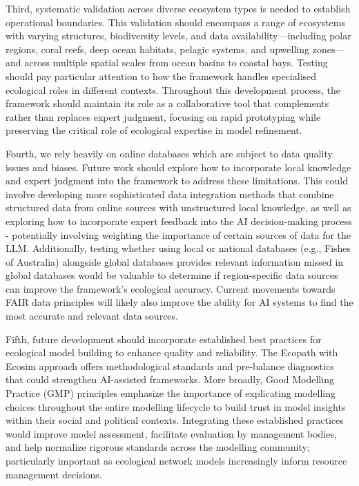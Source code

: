 Third, systematic validation across diverse ecosystem types is needed to establish operational boundaries. This validation should encompass a range of ecosystems with varying structures, biodiversity levels, and data availability—including polar regions, coral reefs, deep ocean habitats, pelagic systems, and upwelling zones—and across multiple spatial scales from ocean basins to coastal bays. Testing should pay particular attention to how the framework handles specialised ecological roles in different contexts. Throughout this development process, the framework should maintain its role as a collaborative tool that complements rather than replaces expert judgment, focusing on rapid prototyping while preserving the critical role of ecological expertise in model refinement.

Fourth, we rely heavily on online databases which are subject to data quality issues and biases. Future work should explore how to incorporate local knowledge and expert judgment into the framework to address these limitations. This could involve developing more sophisticated data integration methods that combine structured data from online sources with unstructured local knowledge, as well as exploring how to incorporate expert feedback into the AI decision-making process - potentially involving weighting the importance of certain sources of data for the LLM. Additionally, testing whether using local or national databases (e.g., Fishes of Australia) alongside global databases provides relevant information missed in global databases would be valuable to determine if region-specific data sources can improve the framework's ecological accuracy. Current movements towards FAIR data principles \citep{tanhua2019ocean} will likely also improve the ability for AI systems to find the most accurate and relevant data sources.

Fifth, future development should incorporate established best practices for ecological model building to enhance quality and reliability. The Ecopath with Ecosim approach offers methodological standards \citep{Christensen2004, heymans2016best} and pre-balance diagnostics \citep{link2010adding} that could strengthen AI-assisted frameworks. More broadly, Good Modelling Practice (GMP) principles \citep{jakeman2024towards} emphasize the importance of explicating modelling choices throughout the entire modelling lifecycle to build trust in model insights within their social and political contexts. Integrating these established practices would improve model assessment, facilitate evaluation by management bodies, and help normalize rigorous standards across the modelling community; particularly important as ecological network models increasingly inform resource management decisions.

